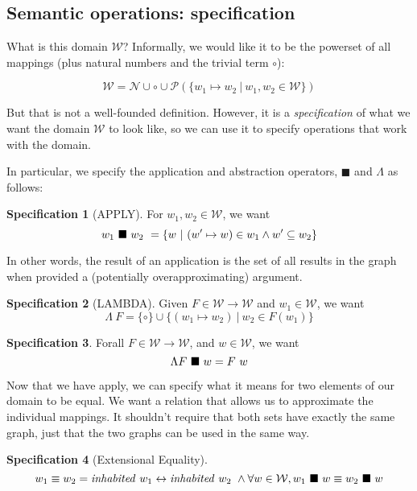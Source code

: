 \documentclass{article}
\theoremstyle{definition}
\newtheorem{spec}{Specification}[section]
\begin{document}
\subsection{Semantic operations: specification}


What is this domain $\mathcal{W}$? Informally, we would like it to be the
powerset of all mappings (plus natural numbers and the trivial term $\circ$):

\[ \mathcal{W} = \mathcal{N} \cup \circ \cup \mathscr{P}( 
  \{ w_1 \mapsto w_2\ |\ w_1, w_2 \in \mathcal{W} \} )  \] 

\noindent But that is not a well-founded definition.  However, it is a
\emph{specification} of what we want the domain $\mathcal{W}$ to look like, so 
we can use it to specify operations that work with the domain. 

In particular, we specify the application and abstraction operators,
$\blacksquare$ and $\Lambda$ as follows:

\begin{spec}[APPLY] For $w_1, w_2 \in \mathcal{W}$, we want
\[  {w_1}\ \blacksquare\ {w_2}\ = \{ w\ |\ (w' \mapsto w) \in w_1 \wedge w' \subseteq w_2 \} \]
\end{spec}
In other words, the result of an application is the set of all results in the
graph when provided a (potentially overapproximating) argument.

\begin{spec}[LAMBDA]
  Given $F \in \mathcal{W} \rightarrow \mathcal{W}$ and
  $w_1 \in \mathcal{W}$, we want
\[ \Lambda\ F = \{ \circ \} \cup \{ (w_1 \mapsto w_2)\ |\ w_2 \in F(w_1) \} \]
\end{spec}


\begin{spec}
Forall $F \in \mathcal{W} \rightarrow \mathcal{W}$, and 
  $w\in\mathcal{W}$, we want
  \[ \apply{\Lambda F}{w} = F\ w \]
\end{spec}

Now that we have apply, we can specify what it means for two elements of 
our domain to be equal. We want a relation that allows us to approximate 
the individual mappings. It shouldn't require that both sets have exactly 
the same graph, just that the two graphs can be used in the same way. 
\begin{spec}[Extensional Equality]
\[ w_1 \equiv w_2 = \mathit{inhabited}\ {w_1} \leftrightarrow \mathit{inhabited}\ {w_2}\ \wedge
  \forall w \in \mathcal{W}, {w_1}\ \blacksquare\ {w} \equiv {w_2}\ \blacksquare\ {w} \]
\end{spec}
  
\end{document}
